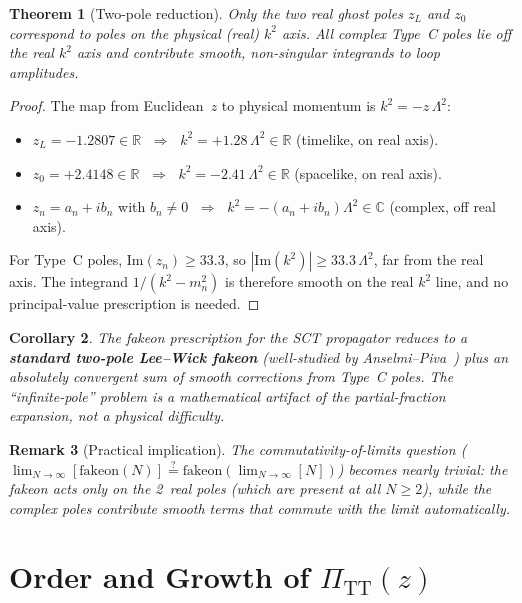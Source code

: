 \documentclass[11pt,a4paper]{article}
\newcommand{\PiTT}{\Pi_{\mathrm{TT}}}
\newcommand{\Imag}{\mathrm{Im}}
\newtheorem{theorem}{Theorem}[section]
\newtheorem{corollary}[theorem]{Corollary}
\newtheorem{remark}[theorem]{Remark}
\begin{document}
\begin{theorem}[Two-pole reduction]
\label{thm:twopole}
Only the two real ghost poles $z_L$ and $z_0$ correspond to poles on
the physical (real) $k^2$ axis.  All complex Type~C poles lie off the
real $k^2$ axis and contribute smooth, non-singular integrands to
loop amplitudes.
\end{theorem}

\begin{proof}
The map from Euclidean~$z$ to physical momentum is
$k^2 = -z\,\Lambda^2$:
\begin{itemize}[nosep]
  \item $z_L = -1.2807 \in \mathbb{R}$ $\;\Rightarrow\;$
    $k^2 = +1.28\,\Lambda^2 \in \mathbb{R}$ (timelike,
    on real axis).
  \item $z_0 = +2.4148 \in \mathbb{R}$ $\;\Rightarrow\;$
    $k^2 = -2.41\,\Lambda^2 \in \mathbb{R}$ (spacelike,
    on real axis).
  \item $z_n = a_n + ib_n$ with $b_n \neq 0$ $\;\Rightarrow\;$
    $k^2 = -(a_n + ib_n)\Lambda^2 \in \mathbb{C}$
    (complex, off real axis).
\end{itemize}
For Type~C poles, $\Imag(z_n) \geq 33.3$, so
$|\Imag(k^2)| \geq 33.3\,\Lambda^2$, far from the real axis.
The integrand $1/(k^2 - m_n^2)$ is therefore smooth on the
real $k^2$ line, and no principal-value prescription is needed.
\end{proof}

\begin{corollary}
The fakeon prescription for the SCT propagator reduces to a
\textbf{standard two-pole Lee--Wick fakeon} (well-studied by
Anselmi--Piva~\cite{AnselmiPiva2017,Anselmi2018}) plus an
absolutely convergent sum of smooth corrections from Type~C poles.
The ``infinite-pole'' problem is a mathematical artifact of the
partial-fraction expansion, not a physical difficulty.
\end{corollary}

\begin{remark}[Practical implication]
The commutativity-of-limits question
($\lim_{N\to\infty}[\text{fakeon}(N)] \stackrel{?}{=}
\text{fakeon}(\lim_{N\to\infty}[N])$)
becomes nearly trivial: the fakeon acts only on the 2~real poles
(which are present at all $N \geq 2$), while the complex poles
contribute smooth terms that commute with the limit automatically.
\end{remark}


\section{Order and Growth of $\PiTT(z)$}
\label{sec:growth}
\end{document}
